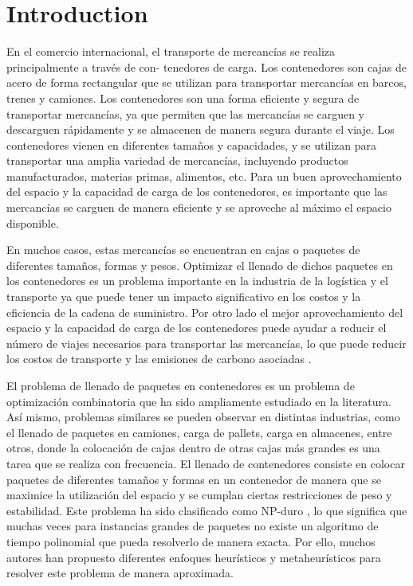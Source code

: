 \section{Introduction} \label{sec: introduction}

En el comercio internacional, el transporte de mercancías se realiza principalmente a través de con- tenedores de carga. Los contenedores son cajas de acero de forma rectangular que se utilizan para transportar mercancías en barcos, trenes y camiones. Los contenedores son una forma eficiente y segura de transportar mercancías, ya que permiten que las mercancías se carguen y descarguen rápidamente y se almacenen de manera segura durante el viaje. Los contenedores vienen en diferentes tamaños y capacidades, y se utilizan para transportar una amplia variedad de mercancías, incluyendo productos manufacturados, materias primas, alimentos, etc. Para un buen aprovechamiento del espacio y la capacidad de carga de los contenedores, es importante que las mercancías se carguen de manera eficiente y se aproveche al máximo el espacio disponible.

En muchos casos, estas mercancías se encuentran en cajas o paquetes de diferentes tamaños, formas y pesos. Optimizar el llenado de dichos paquetes en los contenedores es un problema importante en la industria de la logística y el transporte ya que puede tener un impacto significativo en los costos y la eficiencia de la cadena de suministro. Por otro lado el mejor aprovechamiento del espacio y la capacidad de carga de los contenedores puede ayudar a reducir el número de viajes necesarios para transportar las mercancías, lo que puede reducir los costos de transporte y las emisiones de carbono asociadas \cite{Parreo2008AMA}.

El problema de llenado de paquetes en contenedores es un problema de optimización combinatoria que ha sido ampliamente estudiado en la literatura. Así mismo, problemas similares se pueden observar en distintas industrias, como el llenado de paquetes en camiones, carga de pallets, carga en almacenes, entre otros, donde la colocación de cajas dentro de otras cajas más grandes es una tarea que se realiza con frecuencia. El llenado de contenedores consiste en colocar paquetes de diferentes tamaños y formas en un contenedor de manera que se maximice la utilización del espacio y se cumplan ciertas restricciones de peso y estabilidad. Este problema ha sido clasificado como NP-duro \textcite{PISINGER2002382}, lo que significa que muchas veces para instancias grandes de paquetes no existe un algoritmo de tiempo polinomial que pueda resolverlo de manera exacta. Por ello, muchos autores han propuesto diferentes enfoques heurísticos y metaheurísticos para resolver este problema de manera aproximada.

